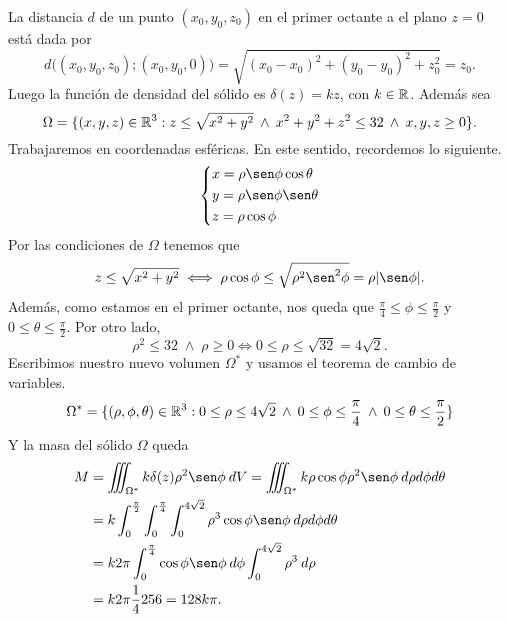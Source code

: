 \begin{solution}
  La distancia $d$ de un punto $(x_0,y_0,z_0)$ en el primer octante a el plano $z=0$ est\'a dada por $$d\Big(  (x_0,y_0,z_0); (x_0,y_0, 0) \Big)= \sqrt{(x_0-x_0)^2+(y_0-y_0)^2+z_0^2}=z_0.$$ Luego  la funci\'on de densidad del s\'olido es $\delta(z)=kz$,  con $k\in\mathbb{R}$. Adem\'as  sea $$\Omega=\{(x,y,z)\in\mathbb{R}^3:z\leq\sqrt{x^2+y^2}\:\land\:x^2+y^2+z^2\leq32\:\land\: x,y,z\geq0\}.$$
  Trabajaremos  en coordenadas esf\'ericas.  En este sentido,  recordemos lo siguiente.
  \[
    \begin{dcases}
      x=\rho\sen\phi\cos\theta \\
      y=\rho\sen\phi\sen\theta \\
      z=\rho\cos\phi
    \end{dcases}
  \]
  Por las condiciones de $\Omega$ tenemos que
  $$z\leq\sqrt{x^2+y^2}\iff\rho\cos\phi\leq\sqrt{\rho^2\sen^2\phi}=\rho |\sen\phi|.$$
  Adem\'as, como estamos en el primer octante,  nos queda que $\frac{\pi}{4} \leq\phi\leq\frac{\pi}{2}$ y  $0\leq\theta\leq\frac{\pi}{2}.$
  Por otro lado,  $$ \rho^2\leq32  \; \land \;  \rho \geq 0 \iff     0\leq  \rho\leq\sqrt{32}= 4 \sqrt{2}.$$
  Escribimos nuestro nuevo volumen $\Omega^*$  y usamos el teorema de cambio de variables.
  \[
    \Omega^*=\{(\rho,\phi,\theta)\in\mathbb{R}^3:0\leq\rho\leq4\sqrt{2}\:\land\:0\leq\phi\leq\frac{\pi}{4}\:\land\:0\leq\theta\leq\frac{\pi}{2}\}
  \]
  Y la masa del s\'olido $\Omega$ queda
  \begin{align*}
    M & =\iiint_{\Omega^*}k\delta(z)\rho^2\sen\phi\:dV=\iiint_{\Omega^*}k\rho\cos\phi\rho^2\sen\phi\:d\rho d\phi d\theta \\
      & =k\int_0^{\frac{\pi}{2}} \int_0^{\frac{\pi}{4}} \int_0^{4\sqrt{2}}\rho^3\cos\phi\sen\phi \:d\rho d\phi d\theta   \\
      & =k2\pi\int_0^{\frac{\pi}{4}}\cos\phi\sen\phi\:d\phi\int_0^{4\sqrt{2}}\rho^3\:d\rho                               \\
      & =k2\pi\frac{1}{4}256=128k\pi.
  \end{align*}

\end{solution}